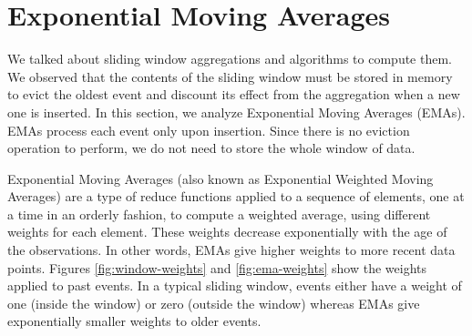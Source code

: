 \section{Exponential Moving Averages} \label{sec:emas}

We talked about sliding window aggregations and algorithms to compute them. We observed that the contents of the sliding window must be stored in memory to evict the oldest event and discount its effect from the aggregation when a new one is inserted. In this section, we analyze Exponential Moving Averages (EMAs). EMAs process each event only upon insertion. Since there is no eviction operation to perform, we do not need to store the whole window of data.

Exponential Moving Averages (also known as Exponential Weighted Moving Averages) \cite{EMA-Everett2011, EMA-Hunter, EMA-MarcusB} are a type of reduce functions applied to a sequence of elements, one at a time in an orderly fashion, to compute a weighted average, using different weights for each element. These weights decrease exponentially with the age of the observations. In other words, EMAs give higher weights to more recent data points. Figures \ref{fig:window-weights} and \ref{fig:ema-weights} show the weights applied to past events. In a typical sliding window, events either have a weight of one (inside the window) or zero (outside the window) whereas EMAs give exponentially smaller weights to older events.

